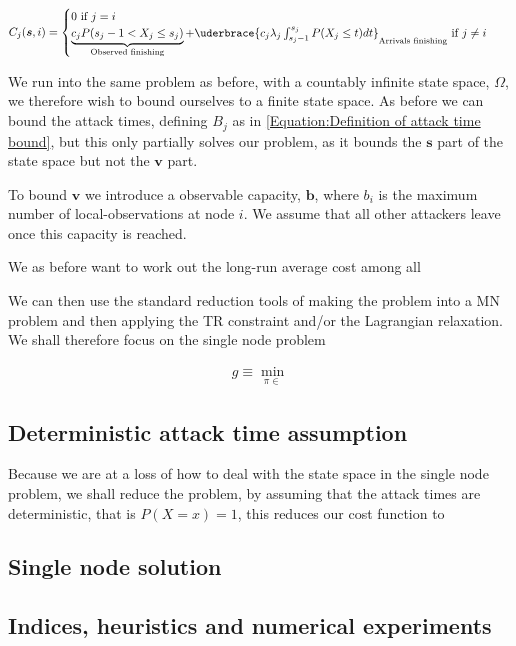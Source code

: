 \documentclass[a4paper,10pt]{article}
\theoremstyle{definition}
\theoremstyle{definition}
\theoremstyle{remark}
\theoremstyle{definition}
\begin{document}
\begin{align*}
C_{j}(\bm{s},i) &= \begin{cases}
0  \text{ if } j=i \\
\underbrace{c_{j} P(s_{j}-1 < X_{j} \leq s_{j})}_{\text{Observed finishing}} + \uderbrace{c_{j} \lambda_{j} \int_{s_{j}-1}^{s_{j}} P(X_{j} \leq t) dt}_{\text{Arrivals finishing}} \text{ if } j \neq i \\
\end{cases}
\end{align*}

We run into the same problem as before, with a countably infinite state space, $\Omega$, we therefore wish to bound ourselves to a finite state space. As before we can bound the attack times, defining $B_{j}$ as in \ref{Equation:Definition of attack time bound}, but this only partially solves our problem, as it bounds the $\bm{s}$ part of the state space but not the $\bm{v}$ part.

To bound $\bm{v}$ we introduce a observable capacity, $\bm{b}$, where $b_{i}$ is the maximum number of local-observations at node $i$. We assume that all other attackers leave once this capacity is reached.

We as before want to work out the long-run average cost among all 

We can then use the standard reduction tools of making the problem into a MN problem and then applying the TR constraint and/or the Lagrangian relaxation. We shall therefore focus on the single node problem

\begin{align*}
g \equiv \min\limits_{\pi \in}
\end{align*}

\subsection{Deterministic attack time assumption}
Because we are at a loss of how to deal with the state space in the single node problem, we shall reduce the problem, by assuming that the attack times are deterministic, that is $P(X=x)=1$, this reduces our cost function to


\subsection{Single node solution}
\subsection{Indices, heuristics and numerical experiments}
\end{document}
